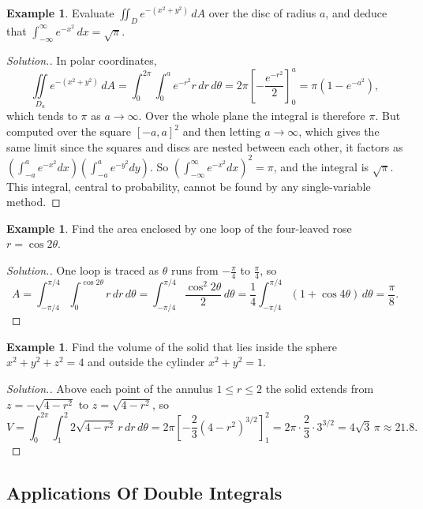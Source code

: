 \documentclass[11pt,a4paper]{article}
\theoremstyle{definition}
\newtheorem{exa}[thm]{Example}
\newenvironment{solution}
  {\renewcommand{\qedsymbol}{}\begin{proof}[\textit{Solution}.]}
  {\end{proof}}
\begin{document}
\begin{exa}
\label{ex:gaussian}
Evaluate $\iint_D e^{-(x^2 + y^2)}\,dA$ over the disc of radius $a$, and deduce
that $\int_{-\infty}^\infty e^{-x^2}\,dx = \sqrt\pi$.
\end{exa}

\begin{solution}
In polar coordinates,
\[\iint\limits_{D_a} e^{-(x^2+y^2)}\,dA = \int_0^{2\pi}\int_0^a e^{-r^2}r\,dr\,
d\theta = 2\pi\left[-\frac{e^{-r^2}}{2}\right]_0^a = \pi\left(1 -
e^{-a^2}\right),\]
which tends to $\pi$ as $a\to\infty$. Over the whole plane the integral is
therefore $\pi$. But computed over the square $[-a,a]^2$ and then letting
$a\to\infty$, which gives the same limit since the squares and discs are nested
between each other, it factors as
$\left(\int_{-a}^a e^{-x^2}dx\right)\left(\int_{-a}^a e^{-y^2}dy\right)$. So
$\left(\int_{-\infty}^\infty e^{-x^2}dx\right)^2 = \pi$, and the integral is
$\sqrt\pi$. This integral, central to probability, cannot be found by any
single-variable method.
\end{solution}

\begin{exa}
\label{ex:rose}
Find the area enclosed by one loop of the four-leaved rose $r = \cos 2\theta$.
\end{exa}

\begin{solution}
One loop is traced as $\theta$ runs from $-\frac{\pi}{4}$ to $\frac{\pi}{4}$, so
\[A = \int_{-\pi/4}^{\pi/4}\int_0^{\cos 2\theta}r\,dr\,d\theta =
\int_{-\pi/4}^{\pi/4}\frac{\cos^2 2\theta}{2}\,d\theta =
\frac14\int_{-\pi/4}^{\pi/4}(1 + \cos 4\theta)\,d\theta = \frac{\pi}{8} .\]
\end{solution}

\begin{exa}
\label{ex:sphereincylinder}
Find the volume of the solid that lies inside the sphere $x^2 + y^2 + z^2 = 4$
and outside the cylinder $x^2 + y^2 = 1$.
\end{exa}

\begin{solution}
Above each point of the annulus $1\leq r\leq 2$ the solid extends from
$z = -\sqrt{4 - r^2}$ to $z = \sqrt{4 - r^2}$, so
\[V = \int_0^{2\pi}\int_1^2 2\sqrt{4 - r^2}\,r\,dr\,d\theta = 2\pi\left[-\frac23(4
- r^2)^{3/2}\right]_1^2 = 2\pi\cdot\frac23\cdot 3^{3/2} = 4\sqrt3\,\pi\approx
21.8 .\]
\end{solution}

{\color[wave]{485}\subsection{Applications Of Double Integrals}}
\end{document}

